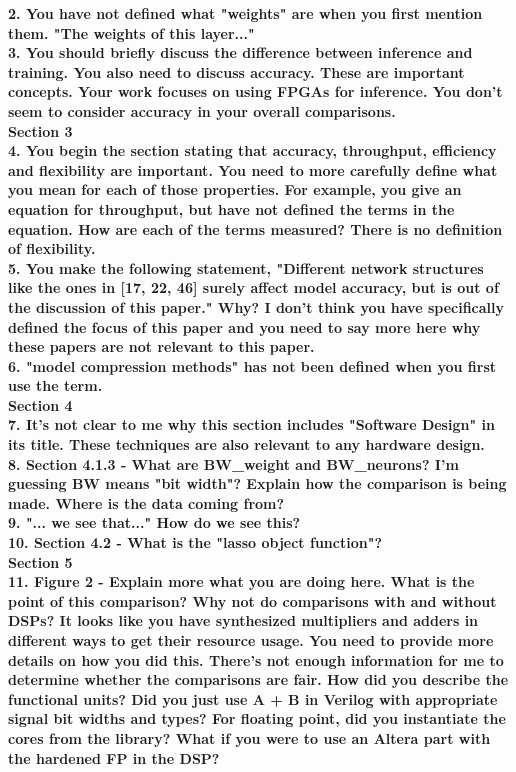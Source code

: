 \documentclass[12pt]{paper}
\newcommand{\comment}[1]{\noindent\textbf{#1}\\}
\begin{document}
\comment{2. You have not defined what "weights" are when you first mention them.  "The weights of this layer..."}

\comment{3. You should briefly discuss the difference between inference and training. You also need to discuss accuracy. These are important concepts. Your work focuses on using FPGAs for inference. You don't seem to consider accuracy in your overall comparisons.}

{\noindent\textbf{Section 3}}\\

\comment{4. You begin the section stating that accuracy, throughput, efficiency and flexibility are important. You need to more carefully define what you mean for each of those properties.  For example, you give an equation for throughput, but have not defined the terms in the equation.  How are each of the terms measured? There is no definition of flexibility.}

\comment{5. You make the following statement, "Different network structures like the ones in [17, 22, 46] surely affect model accuracy, but is out of the discussion of this paper." Why? I don't think you have specifically defined the focus of this paper and you need to say more here why these papers are not relevant to this paper.}

\comment{6. "model compression methods" has not been defined when you first use the term.}

{\noindent\textbf{Section 4}}\\

\comment{7. It's not clear to me why this section includes "Software Design" in its title. These techniques are also relevant to any hardware design.}

\comment{8. Section 4.1.3 - What are BW\_weight and BW\_neurons? I'm guessing BW means "bit width"? Explain how the comparison is being made. Where is the data coming from?}

\comment{9. "... we see that..." How do we see this?}

\comment{10. Section 4.2 - What is the "lasso object function"?}

{\noindent\textbf{Section 5}}\\

\comment{11. Figure 2 - Explain more what you are doing here. What is the point of this comparison? Why not do comparisons with and without DSPs? It looks like you have synthesized multipliers and adders in different ways to get their resource usage. You need to provide more details on how you did this. There's not enough information for me to determine whether the comparisons are fair. How did you describe the functional units? Did you just use A + B in Verilog with appropriate signal bit widths and types? For floating point, did you instantiate the cores from the library? What if you were to use an Altera part with the hardened FP in the DSP?}
\end{document}
